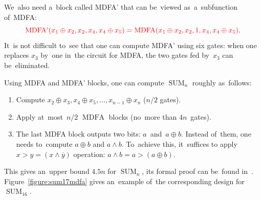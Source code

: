 \documentclass[a4paper, UKenglish, cleveref, autoref,  thm-restate]{lipics-v2021}
\DeclareMathOperator{\SUM}{SUM}
\DeclareMathOperator{\MDFA}{MDFA}
\begin{document}
    We~also need a~block called MDFA' that can be~viewed as~a~subfunction of~MDFA:
    \[\textcolor{red}{\operatorname{MDFA'}(x_1 \oplus x_2, x_2, x_4, x_4 \oplus x_5)=\operatorname{MDFA}(x_1 \oplus x_2, x_2, 1, x_4, x_4 \oplus x_5)}.\]
    It~is not difficult to~see that one can compute MDFA' using six gates: when one replaces $x_3$ by~one in~the circuit for MDFA,
    the two gates fed by~$x_3$ can be~eliminated.

    Using MDFA and MDFA' blocks, one can compute $\SUM_n$ roughly as~follows:
    \begin{enumerate}
        \item Compute $x_2 \oplus x_3, x_4 \oplus x_5, \dotsc, x_{n-1} \oplus x_n$ ($n/2$ gates).
        \item Apply at~most~$n/2$ $\MDFA$ blocks (no~more than $4n$~gates).
        \item The last MDFA block outputs two bits: $a$~and~$a\oplus b$. Instead of~them, one needs to~compute $a \oplus b$ and $a \land b$. To~achieve this,
        it~suffices to apply $x>y=(x \land \overline{y})$ operation:
        \(a \land b = a>(a \oplus b)\).
    \end{enumerate}
    This gives an~upper bound $4.5n$ for $\SUM_n$, its formal proof can
    be~found in~\cite{DBLP:journals/ipl/DemenkovKKY10}.
    Figure~\ref{figure:sum17mdfa} gives an~example of~the corresponding design
    for~$\SUM_{16}$.
\end{document}
